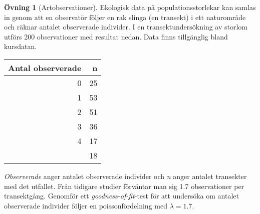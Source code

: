 \documentclass[
]{book}
\theoremstyle{definition}
\theoremstyle{definition}
\theoremstyle{definition}
\newtheorem{exercise}{Övning}[chapter]
\theoremstyle{definition}
\theoremstyle{remark}
\begin{document}
\begin{exercise}[Artobservationer]
Ekologisk data på populationsstorlekar kan samlas in genom att en observatör följer en rak slinga (en transekt) i ett naturområde och räknar antalet observerade individer. I en transektundersökning av storlom utförs 200 observationer med resultat nedan. Data finns tillgänglig bland kursdatan.

\begin{table}
\centering
\begin{tabular}[t]{rr}
\toprule
Antal observerade & n\\
\midrule
0 & 25\\
1 & 53\\
2 & 51\\
3 & 36\\
4 & 17\\
\addlinespace
5 & 18\\
\bottomrule
\end{tabular}
\end{table}

\emph{Observerade} anger antalet observerade individer och \emph{n} anger antalet transekter med det utfallet. Från tidigare studier förväntar man sig 1.7 observationer per transektgång. Genomför ett \emph{goodness-of-fit}-test för att undersöka om antalet observerade individer följer en poissonfördelning med \(\lambda = 1.7\).
\end{exercise}
\end{document}
